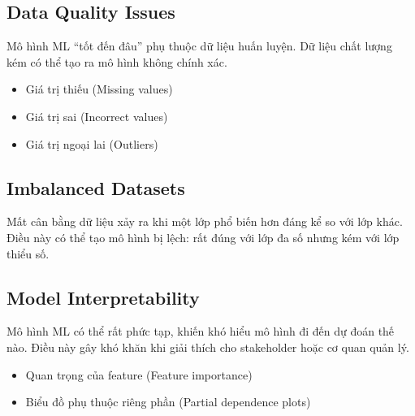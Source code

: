 \subsection{Data Quality Issues}

\begin{dongco}[title={Chất lượng dữ liệu quyết định chất lượng mô hình}]
Mô hình ML “tốt đến đâu” phụ thuộc dữ liệu huấn luyện.
Dữ liệu chất lượng kém có thể tạo ra mô hình không chính xác.
\end{dongco}

\begin{phuongphap}[title={Một số vấn đề chất lượng dữ liệu}]
\begin{itemize}
  \item Giá trị thiếu (Missing values)
  \item Giá trị sai (Incorrect values)
  \item Giá trị ngoại lai (Outliers)
\end{itemize}
\end{phuongphap}

\subsection{Imbalanced Datasets}

\begin{dinhnghia}[title={Imbalanced datasets}]
Mất cân bằng dữ liệu xảy ra khi một lớp phổ biến hơn đáng kể so với lớp khác.
Điều này có thể tạo mô hình bị lệch: rất đúng với lớp đa số nhưng kém với lớp thiểu số.
\end{dinhnghia}

\subsection{Model Interpretability}

\begin{dongco}[title={Mô hình khó giải thích}]
Mô hình ML có thể rất phức tạp, khiến khó hiểu mô hình đi đến dự đoán thế nào.
Điều này gây khó khăn khi giải thích cho stakeholder hoặc cơ quan quản lý.
\end{dongco}

\begin{phuongphap}[title={Một số kỹ thuật hỗ trợ}]
\begin{itemize}
  \item Quan trọng của feature (Feature importance)
  \item Biểu đồ phụ thuộc riêng phần (Partial dependence plots)
\end{itemize}
\end{phuongphap}

